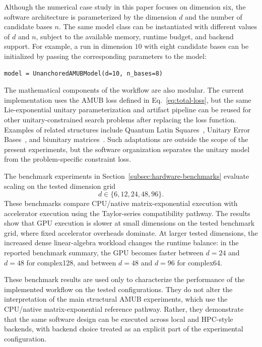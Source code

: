 \documentclass[a4paper,twocolumn,11pt,amsfonts,amssymb]{quantumarticle}
\begin{document}
Although the numerical case study in this paper focuses on dimension six, the software architecture is parameterized by the dimension \(d\) and the number of candidate bases \(n\). The same model class can be instantiated with different values of \(d\) and \(n\), subject to the available memory, runtime budget, and backend support. For example, a run in dimension \(10\) with eight candidate bases can be initialized by passing the corresponding parameters to the model:
{\small
\begin{verbatim}
model = UnanchoredAMUBModel(d=10, n_bases=8)
\end{verbatim}
}

The mathematical components of the workflow are also modular. The current implementation uses the AMUB loss defined in Eq.~\eqref{eq:total-loss}, but the same Lie-exponential unitary parameterization and artifact pipeline can be reused for other unitary-constrained search problems after replacing the loss function. Examples of related structures include Quantum Latin Squares~\cite{musto2019QuantumLatinSquares}, Unitary Error Bases~\cite{knill1996NonBinaryUnitary}, and biunitary matrices~\cite{Vicary_2019BiunitaryConstructions}. Such adaptations are outside the scope of the present experiments, but the software organization separates the unitary model from the problem-specific constraint loss.

The benchmark experiments in Section~\ref{subsec:hardware-benchmarks} evaluate scaling on the tested dimension grid
\[
d \in \{6,12,24,48,96\}.
\]
These benchmarks compare CPU/native matrix-exponential execution with accelerator execution using the Taylor-series compatibility pathway. The results show that GPU execution is slower at small dimensions on the tested benchmark grid, where fixed accelerator overheads dominate. At larger tested dimensions, the increased dense linear-algebra workload changes the runtime balance: in the reported benchmark summary, the GPU becomes faster between \(d=24\) and \(d=48\) for complex128, and between \(d=48\) and \(d=96\) for complex64.

These benchmark results are used only to characterize the performance of the implemented workflow on the tested configurations. They do not alter the interpretation of the main structural AMUB experiments, which use the CPU/native matrix-exponential reference pathway. Rather, they demonstrate that the same software design can be executed across local and HPC-style backends, with backend choice treated as an explicit part of the experimental configuration.
\end{document}
